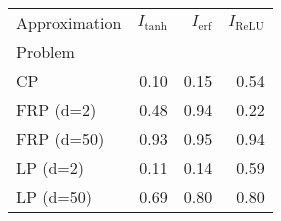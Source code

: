 \begin{tabular}{lrrr}
Approximation & $I_\text{tanh}$ & $I_\text{erf}$ & $I_\text{ReLU}$ \\
Problem &  &  &  \\
CP & 0.10 & 0.15 & 0.54 \\
\cline{1-4}
FRP (d=2) & 0.48 & 0.94 & 0.22 \\
\cline{1-4}
FRP (d=50) & 0.93 & 0.95 & 0.94 \\
\cline{1-4}
LP (d=2) & 0.11 & 0.14 & 0.59 \\
\cline{1-4}
LP (d=50) & 0.69 & 0.80 & 0.80 \\
\cline{1-4}
\end{tabular}
